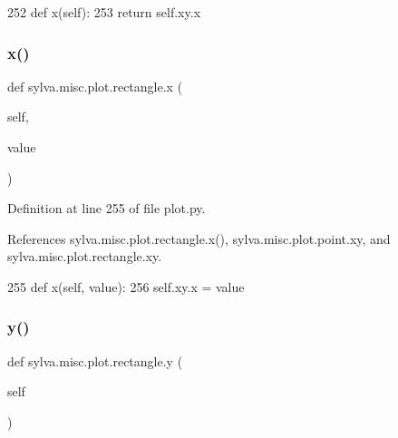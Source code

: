 \begin{DoxyCode}
252     \textcolor{keyword}{def }x(self):
253       \textcolor{keywordflow}{return} self.xy.x
\end{DoxyCode}
\mbox{\label{classsylva_1_1misc_1_1plot_1_1rectangle_a94fe87f391637f1ddf6ab629ffea76a1}} 
\subsubsection{\texorpdfstring{x()}{x()}\hspace{0.1cm}{\footnotesize\ttfamily [2/2]}}
{\footnotesize\ttfamily def sylva.\+misc.\+plot.\+rectangle.\+x (\begin{DoxyParamCaption}\item[{}]{self,  }\item[{}]{value }\end{DoxyParamCaption})}



Definition at line 255 of file plot.\+py.



References sylva.\+misc.\+plot.\+rectangle.\+x(), sylva.\+misc.\+plot.\+point.\+xy, and sylva.\+misc.\+plot.\+rectangle.\+xy.


\begin{DoxyCode}
255     \textcolor{keyword}{def }x(self, value):
256       self.xy.x = value
\end{DoxyCode}
\mbox{\label{classsylva_1_1misc_1_1plot_1_1rectangle_a3067088c7894de27d5a3338077ef027b}} 
\subsubsection{\texorpdfstring{y()}{y()}\hspace{0.1cm}{\footnotesize\ttfamily [1/2]}}
{\footnotesize\ttfamily def sylva.\+misc.\+plot.\+rectangle.\+y (\begin{DoxyParamCaption}\item[{}]{self }\end{DoxyParamCaption})}



